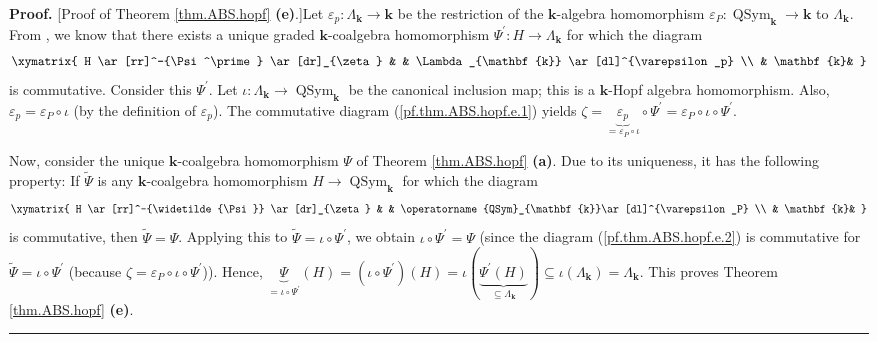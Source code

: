 \documentclass
[numbers=enddot,12pt,final,onecolumn,notitlepage,abstracton]{scrartcl}%
\theoremstyle{definition}
\newenvironment{proof}[1][Proof]{\noindent\textbf{#1.} }{\ \rule{0.5em}{0.5em}}
\newcommand{\kk}{\mathbf{k}}
\newcommand{\QSym}{\operatorname{QSym}_{\mathbf{k}}}
\begin{document}
\begin{proof}
[Proof of Theorem \ref{thm.ABS.hopf} \textbf{(e)}.]Let $\varepsilon
_{p}:\Lambda_{\mathbf{k}}\rightarrow\mathbf{k}$ be the restriction of the
$\mathbf{k}$-algebra homomorphism $\varepsilon_{P}:\operatorname*{QSym}%
\nolimits_{\mathbf{k}}\rightarrow\mathbf{k}$ to $\Lambda_{\mathbf{k}}$. From
\cite[Theorem 4.3]{ABS}, we know that there exists a unique graded
$\mathbf{k}$-coalgebra homomorphism $\Psi^{\prime}:H\rightarrow\Lambda
_{\mathbf{k}}$ for which the diagram%
\begin{equation}%
\xymatrix{
H \ar[rr]^-{\Psi^\prime} \ar[dr]_{\zeta} & & \Lambda_{\kk} \ar
[dl]^{\varepsilon_p} \\
& \kk&
}
\label{pf.thm.ABS.hopf.e.1}%
\end{equation}
is commutative. Consider this $\Psi^{\prime}$. Let $\iota:\Lambda_{\mathbf{k}%
}\rightarrow\operatorname*{QSym}\nolimits_{\mathbf{k}}$ be the canonical
inclusion map; this is a $\mathbf{k}$-Hopf algebra homomorphism. Also,
$\varepsilon_{p}=\varepsilon_{P}\circ\iota$ (by the definition of
$\varepsilon_{p}$). The commutative diagram (\ref{pf.thm.ABS.hopf.e.1}) yields
$\zeta=\underbrace{\varepsilon_{p}}_{=\varepsilon_{P}\circ\iota}\circ
\Psi^{\prime}=\varepsilon_{P}\circ\iota\circ\Psi^{\prime}$.

Now, consider the unique $\mathbf{k}$-coalgebra homomorphism $\Psi$ of Theorem
\ref{thm.ABS.hopf} \textbf{(a)}. Due to its uniqueness, it has the following
property: If $\widetilde{\Psi}$ is any $\mathbf{k}$-coalgebra homomorphism
$H\rightarrow\operatorname*{QSym}\nolimits_{\mathbf{k}}$ for which the diagram%
\begin{equation}%
\xymatrix{
H \ar[rr]^-{\widetilde{\Psi}} \ar[dr]_{\zeta} & & \QSym\ar[dl]^{\varepsilon_P}
\\
& \kk&
}
\label{pf.thm.ABS.hopf.e.2}%
\end{equation}
is commutative, then $\widetilde{\Psi}=\Psi$. Applying this to
$\widetilde{\Psi}=\iota\circ\Psi^{\prime}$, we obtain $\iota\circ\Psi^{\prime
}=\Psi$ (since the diagram (\ref{pf.thm.ABS.hopf.e.2}) is commutative for
$\widetilde{\Psi}=\iota\circ\Psi^{\prime}$ (because $\zeta=\varepsilon
_{P}\circ\iota\circ\Psi^{\prime}$)). Hence, $\underbrace{\Psi}_{=\iota
\circ\Psi^{\prime}}\left(  H\right)  =\left(  \iota\circ\Psi^{\prime}\right)
\left(  H\right)  =\iota\left(  \underbrace{\Psi^{\prime}\left(  H\right)
}_{\subseteq\Lambda_{\mathbf{k}}}\right)  \subseteq\iota\left(  \Lambda
_{\mathbf{k}}\right)  =\Lambda_{\mathbf{k}}$. This proves Theorem
\ref{thm.ABS.hopf} \textbf{(e)}.
\end{proof}
\end{document}
